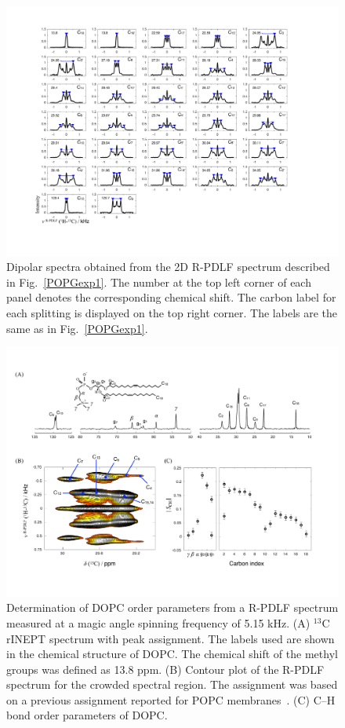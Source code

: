 \documentclass[fleqn,10pt]{wlscirepSI}
\begin{document}
\begin{figure}[p]
  \includegraphics[width=\textwidth]{Figures/POPG_slices.pdf}
  \caption{Dipolar spectra obtained from the 2D R-PDLF spectrum described in Fig.~\ref{POPGexp1}. The number at the top left corner of each panel denotes the corresponding chemical shift. The carbon label for each splitting is displayed on the top right corner. The labels are the same as in Fig.~\ref{POPGexp1}. }
  \label{POPGexp2}
\end{figure}

\begin{figure}
    \centering
    \includegraphics[width=\textwidth]{Figures/DOPCfig.pdf}
    \caption{Determination of DOPC order parameters from a R-PDLF spectrum measured at a magic angle spinning frequency of 5.15 kHz. (A) $^{13}$C rINEPT spectrum with peak assignment. The labels used are shown in the chemical structure of DOPC. The chemical shift of the methyl groups was defined as 13.8 ppm. (B) Contour plot of the R-PDLF spectrum for the crowded spectral region. The assignment was based on a previous assignment reported for POPC membranes~\cite{ferreira13}. (C) C--H bond order parameters of DOPC.}
    \label{fig:DOPCexp}
\end{figure}
\end{document}
